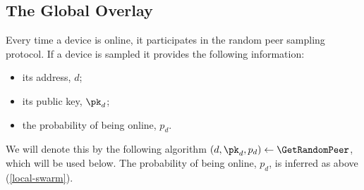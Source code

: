 \subsection{The Global Overlay}
\label{sec:global_overlay}




Every time a device is online, it participates in the random peer sampling 
protocol.
If a device is sampled it provides the following information:
\begin{itemize}
  \item its address, \(d\);
  \item its public key, \(\pk_d\);
  \item the probability of being online, \(p_d\).
\end{itemize}
We will denote this by the following algorithm \((d, \pk_d, p_d)\gets 
  \GetRandomPeer\), which will be used below.
The probability of being online, \(p_d\), is inferred as above 
(\cref{local-swarm}).

